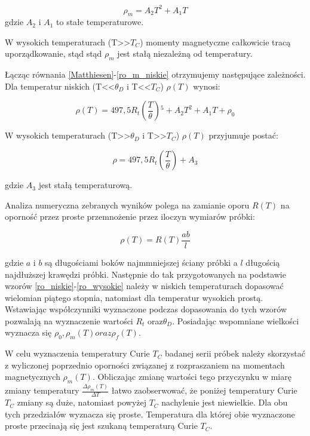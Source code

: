 \documentclass[a4paper,12pt]{article}
\numberwithin{equation}{section}
\begin{document}
 \begin{equation}
    \rho_m=A_2T^2+A_1T
    \label{ro_m_niskie}
 \end{equation}
 gdzie $A_2$ i $A_1$ to stałe temperaturowe.
 
W wysokich temperaturach (T>>$T_C$) momenty magnetyczne całkowicie tracą uporządkowanie, stąd stąd $\rho_m$ jest stałą
niezależną od temperatury.

Łącząc równania \ref{Matthiesen}-\ref{ro_m_niskie} otrzymujemy następujące zależności. Dla temperatur niskich
(T<<$\theta_D$ i T<<$T_C$) $\rho(T)$ wynosi:

  \begin{equation}
    \rho(T)=497,5R{_t}\left(\frac{T}{\theta}\right){^5}
		+A_2T^2+A_1T+\rho_0
    \label{ro_niskie}
  \end{equation}
  
W wysokich temperaturach (T>>$\theta_D$ i T>>$T_C$) $\rho(T)$ przyjumuje postać:

  \begin{equation}
    \rho=497,5R{_t}\left(\frac{T}{\theta}\right)
		+A_3
    \label{ro_wysokie}
  \end{equation}
  
  gdzie $A_3$ jest stałą temperaturową.
  

Analiza numeryczna zebranych wyników polega na zamianie oporu $R(T)$ na oporność przez proste przemnożenie przez
iloczyn wymiarów próbki:

  \begin{equation}
    \rho(T)=R(T)\frac{ab}{l}
    \label{opor->opornosc}
  \end{equation}

  gdzie $a$ i $b$ są długościami boków najmmniejszej ściany próbki a $l$ długością najdłuższej krawędzi próbki.
Następnie do tak przygotowanych na podstawie wzorów \ref{ro_niskie}-\ref{ro_wysokie} należy w niskich temperaturach
dopasować wielomian piątego stopnia, natomiast dla temperatur wysokich prostą. Wstawiając współczynniki wyznaczone
podczas dopasowania do tych wzorów pozwalają na wyznaczenie wartości $R_t$ oraz$\theta_D$. Posiadając wspomniane wielkości
wyznacza się $\rho_0, \rho_m(T) oraz \rho_f(T)$.

W celu wyznaczenia temperatury Curie $T_C$ badanej serii próbek należy skorzystać z wyliczonej poprzednio oporności
związanej z rozpraszaniem na momentach magnetycznych $\rho_m(T)$. Obliczając zmianę wartości tego przyczynku 
w miarę zmiany temperatury $\frac{\Delta\rho_{m}(T)}{\Delta T}$ łatwo zaobserwować, że poniżej temperatury Curie
$T_C$ zmiany są duże, natomiast powyżej $T_C$ nachylenie jest niewielkie. Dla obu tych przedziałów wyznacza się 
proste. Temperatura dla której obie wyznaczone proste przecinają się jest szukaną temperaturą Curie $T_C$.
\end{document}
